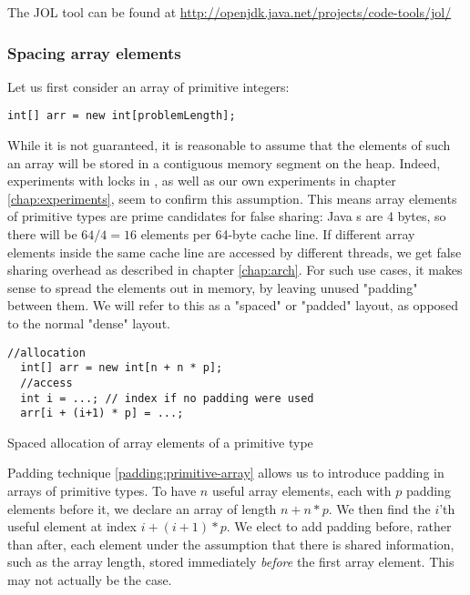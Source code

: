 The JOL tool can be found at
\url{http://openjdk.java.net/projects/code-tools/jol/}

\subsubsection{Spacing array elements}

Let us first consider an array of primitive integers:

\begin{code}[h]
\begin{Verbatim}[frame=single]
  int[] arr = new int[problemLength];
\end{Verbatim}
	\caption{}
\end{code}

While it is not guaranteed, it is reasonable to assume that the elements of such
an array will be stored in a contiguous memory segment on the heap. Indeed,
experiments with locks in \cite{mystery}, as well as our own experiments in
chapter \ref{chap:experiments}, seem to confirm this assumption. This means
array elements of primitive types are prime candidates for false sharing:
Java s are 4 bytes, so there will be $64/4 = 16$ elements per
64-byte cache line. If different array elements inside the same cache line are
accessed by different threads, we get false sharing overhead as described in
chapter \ref{chap:arch}. For such use cases, it makes sense to spread the
elements out in memory, by leaving unused "padding" between them. We will refer
to this as a "spaced" or "padded" layout, as opposed to the normal "dense"
layout.

\begin{padding}[h]
\begin{Verbatim}[frame=single]
  //allocation
  int[] arr = new int[n + n * p];
  //access
  int i = ...; // index if no padding were used
  arr[i + (i+1) * p] = ...;
\end{Verbatim}
	\caption{Spaced allocation of array elements of a primitive type}
	\label{padding:primitive-array}
\end{padding}

Padding technique \ref{padding:primitive-array} allows us to introduce padding
in arrays of primitive types.
To have $n$ useful array elements, each with $p$ padding elements before it, we
declare an array of length $n + n * p$. We then find the $i$'th useful element
at index $i + (i+1) * p$. We elect to add padding before, rather than after,
each element under the assumption that there is shared information, such as
the array length, stored immediately \textit{before} the first array element.
This may not actually be the case.

